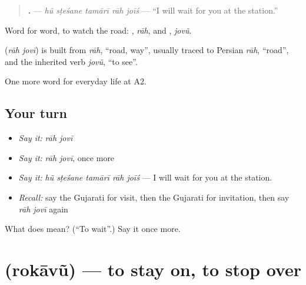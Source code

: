 \begin{quote}
\textbf{    .} — \emph{hũ sṭeśane tamārī rāh joīś} — \textquotedblleft{}I will wait for you at the station.\textquotedblright{}
\end{quote}

Word for word, to watch the road: \textbf{}, \emph{rāh}, and \textbf{}, \emph{jovũ}.

\begin{cousinweb}
\textbf{ } (\emph{rāh jovī}) is built from \emph{rāh}, \textquotedblleft{}road, way\textquotedblright{}, usually traced to Persian \emph{rāh}, \textquotedblleft{}road\textquotedblright{}, and the inherited verb \emph{jovũ}, \textquotedblleft{}to see\textquotedblright{}.
\end{cousinweb}

\begin{grammarlens}[title={What you've built}]
One more word for everyday life at A2.
\end{grammarlens}

\subsection*{Your turn}
\begin{itemize}
\raggedright
  \item \emph{Say it:} \emph{rāh jovī}
  \item \emph{Say it:} \emph{rāh jovī}, once more
  \item \emph{Say it:} \emph{hũ sṭeśane tamārī rāh joīś} — I will wait for you at the station.
  \item \emph{Recall:} say the Gujarati for visit, then the Gujarati for invitation, then say \emph{rāh jovī} again
\end{itemize}

\begin{tcolorbox}[breakable,colback=teal!4,colframe=teal!35!black,title={Before you move on}]
What does   mean? (\textquotedblleft{}To wait\textquotedblright{}.) Say it once more.
\end{tcolorbox}
\section[\texorpdfstring{\gu{રોકાવું} (rokāvũ)}{રોકાવું (rokāvũ)}]{ (rokāvũ) — to stay on, to stop over}

\label{lesson:GU-C180-rokavu}



